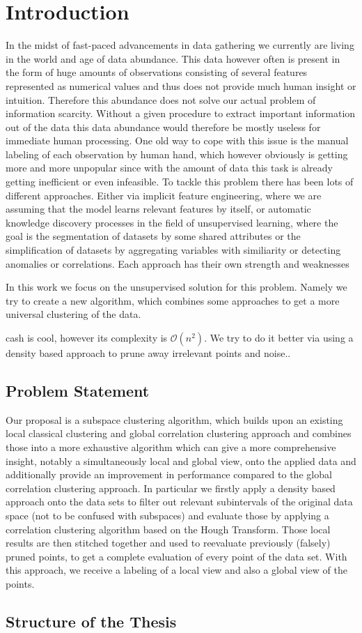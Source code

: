 \chapter{Introduction}

In the midst of fast-paced advancements in data gathering we currently are living in the world and age of data abundance. This data however often is present in the form of huge amounts of observations consisting of several features represented as numerical values and thus does not provide much human insight or intuition. Therefore this abundance does not solve our actual problem of information scarcity. Without a given procedure to extract important information out of the data this data abundance would therefore be mostly useless for immediate human processing. One old way to cope with this issue is the manual labeling of each observation by human hand, which however obviously is getting more and more unpopular since with the amount of data this task is already getting inefficient or even infeasible. %
To tackle this problem there has been lots of different approaches. Either via implicit feature engineering, where we are assuming that the model learns relevant features by itself, or automatic knowledge discovery processes in the field of unsupervised learning, where the goal is  the segmentation of datasets by some shared attributes or the simplification of datasets by aggregating variables with similiarity or detecting anomalies or correlations. Each approach has their own strength and weaknesses

In this work we focus on the unsupervised solution for this problem. Namely we try to create a new algorithm, which combines some approaches to get a more universal clustering of the data.

\acrfull{cash} is cool, however its complexity is $\mathcal{O}(n^2)$.
We try to do it better via using a density based approach to prune away irrelevant points and noise..

\section{Problem Statement}
Our proposal is a subspace clustering algorithm, which builds upon an existing local classical clustering and global correlation clustering approach and combines those into a more exhaustive algorithm which can give a more comprehensive insight, notably a simultaneously local and global view, onto the applied data and additionally provide an improvement in performance compared to the global correlation clustering approach. In particular we firstly apply a density based approach onto the data sets to filter out relevant subintervals of the original data space (not to be confused with subspaces) and evaluate those by applying a correlation clustering algorithm based on the Hough Transform. Those local results are then stitched together and used to reevaluate previously (falsely) pruned points, to get a complete evaluation of every point of the data set. With this approach, we receive a labeling of a local view and also a global view of the points. 

\section{Structure of the Thesis}
